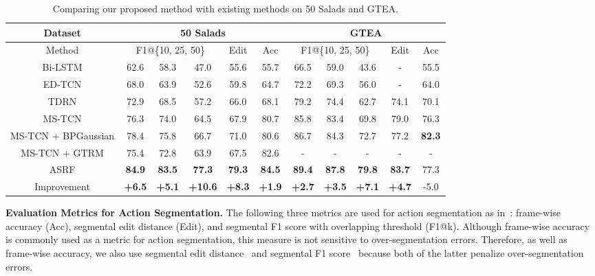 \documentclass[10pt,twocolumn,letterpaper]{article}
\begin{document}
\begin{table*}[t!]
\small
\centering
\begin{tabular}{c | ccccc |ccccc }
\hline
Dataset             & \multicolumn{5}{c}{50 Salads}                        & \multicolumn{5}{c}{GTEA}                            \\ \hline
Method               & \multicolumn{3}{c}{F1@\{10, 25, 50\}} & Edit & Acc  & \multicolumn{3}{c}{F1@\{10, 25, 50\}} & Edit  & Acc  \\ \hline
Bi-LSTM \cite{bi-lstm2}       & 62.6   & 58.3   & 47.0   & 55.6   & 55.7                              & 66.5   & 59.0   & 43.6   & -      & 55.5            \\ 
ED-TCN \cite{tcn}             & 68.0   & 63.9   & 52.6   & 59.8   & 64.7                              & 72.2   & 69.3   & 56.0   & -      & 64.0            \\ 
TDRN \cite{deform}            & 72.9   & 68.5   & 57.2   & 66.0   & 68.1                              & 79.2   & 74.4   & 62.7   & 74.1   & 70.1            \\ 
MS-TCN \cite{tcn}             & 76.3   & 74.0   & 64.5   & 67.9   & 80.7                              & 85.8   & 83.4   & 69.8   & 79.0   & 76.3            \\ 
MS-TCN + BPGaussian \cite{bpgaussian}  & 78.4   & 75.8   & 66.7   & 71.0   & 80.6                     & 86.7   & 84.3   & 72.7   & 77.2   & \textbf{82.3}  \\
MS-TCN + GTRM \cite{as_graph} & 75.4   & 72.8   & 63.9   & 67.5   & 82.6                              & -      & -      & -      & -      & -               \\ \hline
ASRF                          & \textbf{84.9} & \textbf{83.5} & \textbf{77.3} & \textbf{79.3} & \textbf{84.5}    & \textbf{89.4} & \textbf{87.8} & \textbf{79.8} & \textbf{83.7} & 77.3  \\
\rowcolor[gray]{0.90}
Improvement                   & \textbf{+6.5}    & \textbf{+5.1}    & \textbf{+10.6}   & \textbf{+8.3}    & \textbf{+1.9}   & \textbf{+2.7}    & \textbf{+3.5}    & \textbf{+7.1}    & \textbf{+4.7}    & -5.0 \\ \hline
\end{tabular}
\caption{Comparing our proposed method with existing methods on 50 Salads and GTEA.}
\label{tab:50salads gtea}
\end{table*}

\textbf{Evaluation Metrics for Action Segmentation.}
The following three metrics are used for action segmentation as in~\cite{icra,markov2,tcn}: frame-wise accuracy (Acc), segmental edit distance (Edit), and segmental F1 score with overlapping threshold  (F1@k). 
Although frame-wise accuracy is commonly used as a metric for action segmentation, this measure is not sensitive to over-segmentation errors.
Therefore, as well as frame-wise accuracy, we also use segmental edit distance~\cite{icra,markov2} and segmental F1 score~\cite{tcn} because both of the latter penalize over-segmentation errors.
\end{document}
